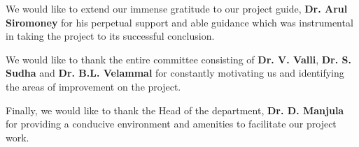 We would like to extend our immense gratitude to our project guide, \textbf{Dr. Arul Siromoney} for his perpetual support and able guidance which was instrumental in taking the project to its successful conclusion. 

We would like to thank the entire committee consisting of \textbf{Dr. V. Valli}, \textbf{Dr. S. Sudha} and \textbf{Dr. B.L. Velammal} for constantly motivating us and identifying the areas of improvement on the project. 

Finally, we would like to thank the Head of the department, \textbf{Dr. D. Manjula} for providing a conducive environment and amenities to facilitate our project work.